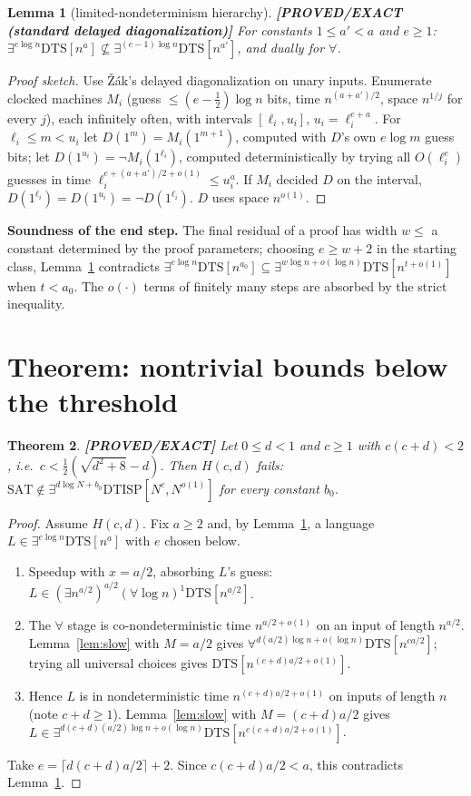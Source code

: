\documentclass[11pt]{article}
\newtheorem{theorem}{Theorem}
\newtheorem{lemma}[theorem]{Lemma}
\theoremstyle{definition}
\theoremstyle{remark}
\newcommand{\DTS}{\mathrm{DTS}}
\newcommand{\DTISP}{\mathrm{DTISP}}
\newcommand{\SAT}{\mathrm{SAT}}
\newcommand{\status}[1]{\textbf{[#1]}}
\begin{document}
\begin{lemma}[limited-nondeterminism hierarchy]\label{lem:hier} \status{PROVED/EXACT (standard delayed diagonalization)}
For constants $1\le a'<a$ and $e\ge1$:
$\exists^{e\log n}\DTS[n^{a}]\not\subseteq\exists^{(e-1)\log n}\DTS[n^{a'}]$, and dually for $\forall$.
\end{lemma}
\begin{proof}[Proof sketch]
Use \v{Z}\'ak's delayed diagonalization on unary inputs. Enumerate clocked machines $M_i$ (guess
$\le(e-\tfrac12)\log n$ bits, time $n^{(a+a')/2}$, space $n^{1/j}$ for every $j$), each infinitely often,
with intervals $[\ell_i,u_i]$, $u_i=\ell_i^{e+a}$. For $\ell_i\le m<u_i$ let $D(1^m)=M_i(1^{m+1})$, computed
with $D$'s own $e\log m$ guess bits; let $D(1^{u_i})=\neg M_i(1^{\ell_i})$, computed deterministically by
trying all $O(\ell_i^{e})$ guesses in time $\ell_i^{e+(a+a')/2+o(1)}\le u_i^{a}$. If $M_i$ decided $D$ on the
interval, $D(1^{\ell_i})=D(1^{u_i})=\neg D(1^{\ell_i})$. $D$ uses space $n^{o(1)}$.
\end{proof}

\noindent\textbf{Soundness of the end step.} The final residual of a proof has width $w\le$ a constant
determined by the proof parameters; choosing $e\ge w+2$ in the starting class, Lemma~\ref{lem:hier}
contradicts $\exists^{e\log n}\DTS[n^{a_0}]\subseteq\exists^{w\log n+o(\log n)}\DTS[n^{t+o(1)}]$ when $t<a_0$.
The $o(\cdot)$ terms of finitely many steps are absorbed by the strict inequality.

\section{Theorem: nontrivial bounds below the threshold}

\begin{theorem}\label{thm:positive} \status{PROVED/EXACT}
Let $0\le d<1$ and $c\ge1$ with $c(c+d)<2$, i.e.\ $c<\tfrac12(\sqrt{d^2+8}-d)$. Then $H(c,d)$ fails:
$\SAT\notin\exists^{d\log N+b_0}\DTISP[N^c,N^{o(1)}]$ for every constant $b_0$.
\end{theorem}
\begin{proof}
Assume $H(c,d)$. Fix $a\ge2$ and, by Lemma~\ref{lem:hier}, a language
$L\in\exists^{e\log n}\DTS[n^a]$ with $e$ chosen below.
\begin{enumerate}
\item Speedup with $x=a/2$, absorbing $L$'s guess:
$L\in(\exists n^{a/2})^{a/2}(\forall\log n)^1\DTS[n^{a/2}]$.
\item The $\forall$ stage is co-nondeterministic time $n^{a/2+o(1)}$ on an input of length $n^{a/2}$.
Lemma~\ref{lem:slow} with $M=a/2$ gives $\forall^{d(a/2)\log n+o(\log n)}\DTS[n^{ca/2}]$; trying all
universal choices gives $\DTS[n^{(c+d)a/2+o(1)}]$.
\item Hence $L$ is in nondeterministic time $n^{(c+d)a/2+o(1)}$ on inputs of length $n$ (note $c+d\ge1$).
Lemma~\ref{lem:slow} with $M=(c+d)a/2$ gives
$L\in\exists^{d(c+d)(a/2)\log n+o(\log n)}\DTS[n^{c(c+d)a/2+o(1)}]$.
\end{enumerate}
Take $e=\lceil d(c+d)a/2\rceil+2$. Since $c(c+d)a/2<a$, this contradicts Lemma~\ref{lem:hier}.
\end{proof}
\end{document}

